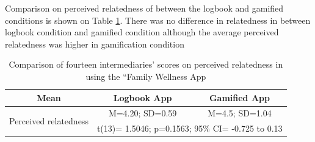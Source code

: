 Comparison on perceived relatedness of between the logbook and gamified conditions is shown on Table \ref{table:imiwellnessinterm2}. There was no difference in relatedness in between logbook condition and gamified condition although the average perceived relatedness was higher in gamification condition\newline 
\begin{table}[h!]
  \begin{center}
    \caption{Comparison of fourteen intermediaries' scores on perceived relatedness in using the ``Family Wellness App}
    \label{table:imiwellnessinterm2}
	\begin{tabular}{|c|c|c|}
		\hline
		Mean &Logbook App&Gamified App\\
		\hline
		 \multirow{2}{*}{Perceived relatedness}&M=4.20; SD=0.59&M=4.5; SD=1.04\\\cline{2-3} 
		 &\multicolumn{2}{|l|}{t(13)= 1.5046; p=0.1563; 95\% CI= -0.725 to 0.13} \\
\hline
	\end{tabular}
  \end{center}
\end{table}
\newline
\begin{flushright}

\end{flushright}

